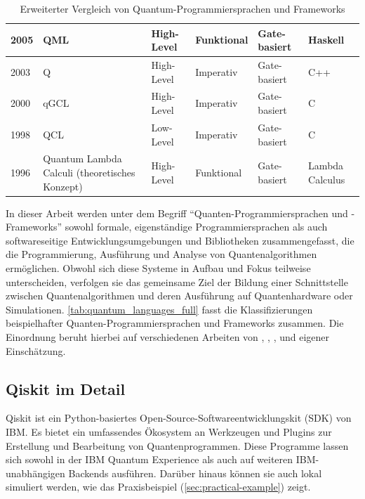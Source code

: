 \begin{table}[ht!]
\begin{tabularx}{\textwidth}{|l|p{2cm}|l|l|l|X|}
\hline
2005 & QML & High-Level & Funktional & Gate-basiert & Haskell \\
\hline
2003 & Q & High-Level & Imperativ & Gate-basiert & C++ \\
\hline
2000 & qGCL & High-Level & Imperativ &  Gate-basiert & C \\
\hline
1998 & QCL & Low-Level & Imperativ & Gate-basiert & C \\
\hline
1996 & Quantum Lambda Calculi (theoretisches Konzept) & High-Level & Funktional & Gate-basiert & Lambda Calculus \\
\hline
\end{tabularx}
\caption{Erweiterter Vergleich von Quantum-Programmiersprachen und Frameworks}
\label{tab:quantum_languages_full}
\end{table}

In dieser Arbeit werden unter dem Begriff \enquote{Quanten-Programmiersprachen und -Frameworks} sowohl formale, eigenständige Programmiersprachen als auch softwareseitige Entwicklungsumgebungen und Bibliotheken zusammengefasst, die die Programmierung, Ausführung und Analyse von Quantenalgorithmen ermöglichen. Obwohl sich diese Systeme in Aufbau und Fokus teilweise unterscheiden, verfolgen sie das gemeinsame Ziel der Bildung einer Schnittstelle zwischen Quantenalgorithmen und deren Ausführung auf Quantenhardware oder Simulationen. \autoref{tab:quantum_languages_full} fasst die Klassifizierungen beispielhafter Quanten-Programmiersprachen und Frameworks zusammen. Die Einordnung beruht hierbei auf verschiedenen Arbeiten von \autocite{singhSurveyAvailableTools2024a}, \autocite{ferreiraExploratoryStudyUsage2025}, \autocite{garhwal_quantum_2021}, \autocite{serranoQuantumSoftwareComponents2023a} und eigener Einschätzung.

\subsection{Qiskit im Detail}
\label{sec:qiskit-details}

Qiskit ist ein Python-basiertes Open-Source-Softwareentwicklungskit (SDK) von IBM. Es bietet ein umfassendes Ökosystem an Werkzeugen und Plugins zur Erstellung und Bearbeitung von Quantenprogrammen. Diese Programme lassen sich sowohl in der IBM Quantum Experience als auch auf weiteren IBM-unabhängigen Backends ausführen. \autocite{singhSurveyAvailableTools2024a} Darüber hinaus können sie auch lokal simuliert werden, wie das Praxisbeispiel (\autoref{sec:practical-example}) zeigt. 

